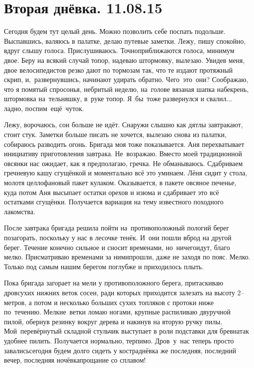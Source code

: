 \chapter{Вторая днёвка. 11.08.15}
\vepsianrose

Сегодня будем тут целый день. Можно позволить себе поспать подольше. Выспавшись, валяюсь в палатке, делаю путевые заметки. Лежу, пишу спокойно, вдруг слышу голоса. Прислушиваюсь. Точно\mdash приближаются голоса, минимум двое. Беру на всякий случай топор, надеваю штормовку, вылезаю. Увидев меня, двое велосипедистов резко дают по тормозам так, что те издают протяжный скрип, и,~развернувшись, начинают удирать обратно. Чего~это~они? Соображаю, что я помятый спросонья, небритый неделю, на~голове вязаная шапка набекрень, штормовка на~тельняшку, в~руке топор. Я~бы~тоже развернулся и свалил$\ldots$ ладно, поспим~ещё~чуток. 

Лежу, ворочаюсь, сон больше не идёт. Снаружи слышно как дятлы завтракают, стоит стук. Заметки больше писать не хочется, вылезаю снова из палатки, собираюсь разводить огонь. Бригада моя тоже показывается. Аня перехватывает инициативу приготовления завтрака. Не~возражаю. Вместо моей традиционной овсянки нас ожидает, как я предполагаю, гречка. Не обманываюсь. Сдабриваем гречневую кашу сгущёнкой и моментально всё это уминаем. Лёня сидит у стола, молотя целлофановый пакет кулаком. Оказывается, в пакете овсяное печенье, куда потом Аня высыпает остатки орехов и изюма и сдабривает это всё остатками сгущёнки. Получается вариация на тему известного походного лакомства.

После завтрака бригада решила пойти на~противоположный пологий берег позагорать, поскольку у нас в лесочке тенёк. И~они пошли вброд на другой берег. Течение конечно сильное и сносит временами, но~ничего\mdash идут, благо мелко. Присматриваю временами за ними\mdash прошли, даже не заходя по пояс. Мелко. Только под самым нашим берегом поглубже и приходилось плыть. 

Пока бригада загорает на мели у противоположного берега, притаскиваю дров\mdash сухих нижних веток сосен, ради которых приходится залезать на высоту 2\thinspace\nobreakdash-- метров, а потом и несколько больших сухих топляков с протоки ниже по~течению. Мелкие~ветки ломаю ногами, крупные распиливаю двуручной пилой, обернув резинку вокруг дерева и накинув на вторую ручку пилы. Мой~перевёрнутый складной стульчик выступает в роли подставки для бревна\mdash так удобнее пилить. Получается нормально, терпимо. Дров~у~нас теперь просто завались\mdash сегодня будем долго сидеть у костра\mdash днёвка же последняя, последний вечер, последняя ночёвка\mdash прощание со сплавом! 

